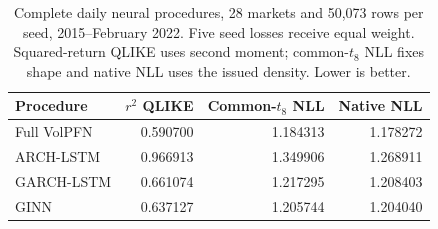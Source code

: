 \begin{table}[!htbp]\centering
\begingroup\small\setlength{\tabcolsep}{4pt}
\caption[Scores for daily financial neural predictors]{Complete daily neural procedures, 28 markets and 50,073 rows per seed, 2015--February 2022. Five seed losses receive equal weight. Squared-return QLIKE uses second moment; common-$t_8$ NLL fixes shape and native NLL uses the issued density. Lower is better.}\label{tab:new-daily-scores}
\begin{tabular}{@{}lrrr@{}}
\toprule
Procedure & $r^2$ QLIKE & Common-$t_8$ NLL & Native NLL \\
\midrule
Full VolPFN & 0.590700 & 1.184313 & 1.178272 \\
ARCH-LSTM & 0.966913 & 1.349906 & 1.268911 \\
GARCH-LSTM & 0.661074 & 1.217295 & 1.208403 \\
GINN & 0.637127 & 1.205744 & 1.204040 \\
\bottomrule
\end{tabular}\endgroup\end{table}

